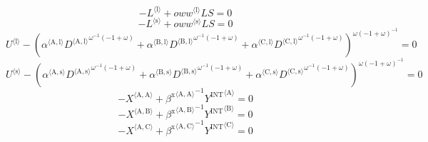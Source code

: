 \begin{equation}
-{L}^{\langle \mathrm{l}\rangle} + {{{o\!w\!w}}^{\langle \mathrm{\mathrm{l}}\rangle}} {{L\!S}} = 0
\end{equation}
\begin{equation}
-{L}^{\langle \mathrm{s}\rangle} + {{{o\!w\!w}}^{\langle \mathrm{\mathrm{s}}\rangle}} {{L\!S}} = 0
\end{equation}
\begin{equation}
{U}^{\langle \mathrm{l}\rangle} - \left({{\alpha}^{\langle \mathrm{\mathrm{A}},\mathrm{\mathrm{l}}\rangle}} {{{D}^{\langle \mathrm{A},\mathrm{l}\rangle}}^{{\omega}^{-1} \left(-1 + \omega\right)}} + {{\alpha}^{\langle \mathrm{\mathrm{B}},\mathrm{\mathrm{l}}\rangle}} {{{D}^{\langle \mathrm{B},\mathrm{l}\rangle}}^{{\omega}^{-1} \left(-1 + \omega\right)}} + {{\alpha}^{\langle \mathrm{\mathrm{C}},\mathrm{\mathrm{l}}\rangle}} {{{D}^{\langle \mathrm{C},\mathrm{l}\rangle}}^{{\omega}^{-1} \left(-1 + \omega\right)}}\right)^{{\omega} \left(-1 + \omega\right)^{-1}} = 0
\end{equation}
\begin{equation}
{U}^{\langle \mathrm{s}\rangle} - \left({{\alpha}^{\langle \mathrm{\mathrm{A}},\mathrm{\mathrm{s}}\rangle}} {{{D}^{\langle \mathrm{A},\mathrm{s}\rangle}}^{{\omega}^{-1} \left(-1 + \omega\right)}} + {{\alpha}^{\langle \mathrm{\mathrm{B}},\mathrm{\mathrm{s}}\rangle}} {{{D}^{\langle \mathrm{B},\mathrm{s}\rangle}}^{{\omega}^{-1} \left(-1 + \omega\right)}} + {{\alpha}^{\langle \mathrm{\mathrm{C}},\mathrm{\mathrm{s}}\rangle}} {{{D}^{\langle \mathrm{C},\mathrm{s}\rangle}}^{{\omega}^{-1} \left(-1 + \omega\right)}}\right)^{{\omega} \left(-1 + \omega\right)^{-1}} = 0
\end{equation}
\begin{equation}
-{X}^{\langle \mathrm{A},\mathrm{A}\rangle} + {{\beta^{\mathrm{x}}}^{\langle \mathrm{\mathrm{A}},\mathrm{\mathrm{A}}\rangle}}^{-1} {{Y^{\mathrm{INT}}}^{\langle \mathrm{A}\rangle}} = 0
\end{equation}
\begin{equation}
-{X}^{\langle \mathrm{A},\mathrm{B}\rangle} + {{\beta^{\mathrm{x}}}^{\langle \mathrm{\mathrm{A}},\mathrm{\mathrm{B}}\rangle}}^{-1} {{Y^{\mathrm{INT}}}^{\langle \mathrm{B}\rangle}} = 0
\end{equation}
\begin{equation}
-{X}^{\langle \mathrm{A},\mathrm{C}\rangle} + {{\beta^{\mathrm{x}}}^{\langle \mathrm{\mathrm{A}},\mathrm{\mathrm{C}}\rangle}}^{-1} {{Y^{\mathrm{INT}}}^{\langle \mathrm{C}\rangle}} = 0
\end{equation}
